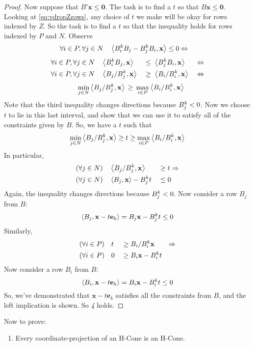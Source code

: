 \documentclass[fleqn]{article}
\renewcommand{\vec}[1]{\mathbf{#1}}
\newcommand{\ip}[2]{\left\langle #1, #2 \right\rangle}
\newcommand{\0}{\vec{0}}
\newcommand{\x}{\vec{x}}
\newcommand{\e}{\vec{e}}
\newcommand{\faij}{\forall i\in P,\forall j \in N}
\begin{document}
\begin{proof}
  Now suppose that $B'\x \leq \0$.  The task is to find a $t$ so that $B\x \leq \0$.  Looking at \eqref{eq:vdropZrows}, any choice of $t$ we make will be okay for rows indexed by $Z$.  So the task is to find a $t$ so that the inequality holds for rows indexed by $P$ and $N$.  Observe
\begin{align*}
  \faij&\quad \ip{\Bik B_j - \Bjk B_i}{\x} \leq 0 \Leftrightarrow
\end{align*}
\vspace{-2.5em}
\begin{alignat*}{4}
  \faij&\quad \ip{\Bik B_j}{\x} &&\leq\; \ip{\Bjk B_i}{\x} &\Leftrightarrow \\
  \faij&\quad \ip{B_j/\Bjk}{\x} &&\geq\; \ip{B_i/\Bik}{\x} &\;\Leftrightarrow 
\end{alignat*}
\vspace{-2em}
\begin{align*}
   \quad\min_{j\in N}  \ip{B_j/\Bjk}{\x} \,\geq\, \max_{i\in P} \ip{B_i/\Bik}{\x}
\end{align*}
Note that the third inequality changes directions because $B^k_j < 0$.  Now we choose $t$ to lie in this last interval, and show that we can use it to satisfy all of the constraints given by $ B$.  So, we have a $t$ such that
\[ \min_{j\in N}  \ip{B_j/\Bjk}{\x} \geq t 
          \geq \max_{i\in P} \ip{B_i/\Bik}{\x} \]
In particular,
\begin{alignat*}{2}
 (\forall j\in N)\quad & \ip{B_j/\Bjk}{\x}     \;&\geq&\; t \Rightarrow \\
 (\forall j\in N)\quad & \ip{B_j}{\x} - \Bjk t \;&\leq&\; 0
\end{alignat*}
Again, the inequality changes directions because $B^k_j < 0$.  Now consider a row $ B_j$ from $ B$:
\[ \ip{B_j}{\x-t\e_k} =  B_j {\x} - \Bjk t \leq 0 \]
Similarly,
\begin{alignat*}{3}
 (\forall i\in P)\quad & t \;&\geq&\;  B_i/\Bik {\x} &\Rightarrow \\
 (\forall i\in P)\quad & 0 \;&\geq&\;  B_i {\x} - \Bik t &
\end{alignat*}
Now consider a row $ B_i$ from $ B$:
\[ \ip{B_i}{\x-t\e_k} =  B_i {\x} - \Bik t \leq 0 \]
So, we've demonstrated that $\x-t\e_k$ satisfies all the constraints from $B$, and the left implication is shown.  So \textit{4} holds.
\end{proof}
Now to prove:
\begin{enumerate}
  \item[\Vproj] Every coordinate-projection of an H-Cone is an H-Cone.
\end{enumerate}
\end{document}
